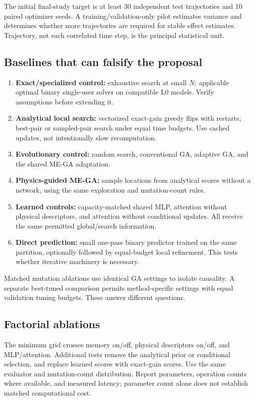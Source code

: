 \documentclass[conference]{IEEEtran}
\begin{document}
The initial final-study target is at least 30 independent test trajectories and 10 paired optimizer seeds. A training/validation-only pilot estimates variance and determines whether more trajectories are required for stable effect estimates. Trajectory, not each correlated time step, is the principal statistical unit.

\subsection{Baselines that can falsify the proposal}
\begin{enumerate}
\item \textbf{Exact/specialized control:} exhaustive search at small $N$; applicable optimal binary single-user solver \cite{zhang} on compatible L0 models. Verify assumptions before extending it.
\item \textbf{Analytical local search:} vectorized exact-gain greedy flips with restarts; best-pair or sampled-pair search under equal time budgets. Use cached updates, not intentionally slow recomputation.
\item \textbf{Evolutionary control:} random search, conventional GA, adaptive GA, and the shared ME-GA adaptation.
\item \textbf{Physics-guided ME-GA:} sample locations from analytical scores without a network, using the same exploration and mutation-count rules.
\item \textbf{Learned controls:} capacity-matched shared MLP, attention without physical descriptors, and attention without conditional updates. All receive the same permitted global/search information.
\item \textbf{Direct prediction:} small one-pass binary predictor trained on the same partition, optionally followed by equal-budget local refinement. This tests whether iterative machinery is necessary.
\end{enumerate}
Matched mutation ablations use identical GA settings to isolate causality. A separate best-tuned comparison permits method-specific settings with equal validation tuning budgets. These answer different questions.

\subsection{Factorial ablations}
The minimum grid crosses memory on/off, physical descriptors on/off, and MLP/attention. Additional tests remove the analytical prior or conditional selection, and replace learned scores with exact-gain scores. Use the same evaluator and mutation-count distribution. Report parameters, operation counts where available, and measured latency; parameter count alone does not establish matched computational cost.
\end{document}
